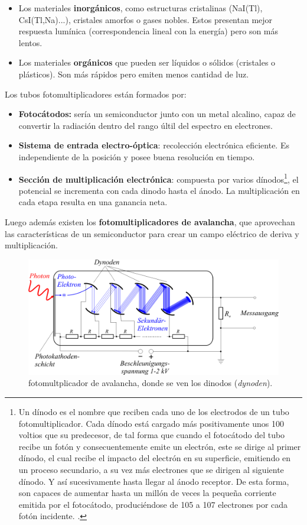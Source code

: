 \begin{itemize}
    \item Los materiales \textbf{inorgánicos}, como estructuras cristalinas (NaI(Tl), CsI(Tl,Na)...), cristales amorfos o gases nobles. Estos presentan mejor respuesta lumínica (correspondencia lineal con la energía) pero son más lentos.
    \item Los materiales \textbf{orgánicos} que pueden ser líquidos o sólidos (cristales o plásticos). Son más rápidos pero emiten menos cantidad de luz. 
\end{itemize}


Los tubos fotomultiplicadores están formados por: 

\begin{itemize}
    \item \textbf{Fotocátodos:} sería un semiconductor junto con un metal alcalino, capaz de convertir la radiación dentro del rango últil del espectro en electrones.
    \item \textbf{Sistema de entrada electro-óptica}: recolección electrónica eficiente. Es independiente de la posición y posee buena resolución en tiempo. 
    \item \textbf{Sección de multiplicación electrónica}: compuesta por varios  dínodos\footnote{Un dínodo es el nombre que reciben cada uno de los electrodos de un tubo fotomultiplicador. Cada dínodo está cargado más positivamente unos 100 voltios que su predecesor, de tal forma que cuando el fotocátodo del tubo recibe un fotón y consecuentemente emite un electrón, este se dirige al primer dínodo, el cual recibe el impacto del electrón en su superficie, emitiendo en un proceso secundario, a su vez más electrones que se dirigen al siguiente dínodo. Y así sucesivamente hasta llegar al ánodo receptor. De esta forma, son capaces de aumentar hasta un millón de veces la pequeña corriente emitida por el fotocátodo, produciéndose de 105 a 107 electrones por cada fotón incidente. \cite{wiki-dinodo}.}, el potencial se incrementa con cada dinodo hasta el ánodo. La multiplicación en cada etapa resulta en una ganancia neta.    
\end{itemize}
Luego además existen los \textbf{fotomultiplicadores de avalancha}, que aprovechan las características de un semiconductor para crear un campo eléctrico de deriva y multiplicación.

\begin{figure}[H] \centering
    \caption{fotomultplicador de avalancha, donde se ven los dinodos (\textit{dynoden}).}
    \includegraphics[width=0.7\linewidth]{Cuerpo/Ch_01/Detectores_Fotomultiplicador.png}
\end{figure}

